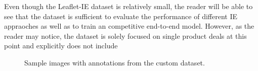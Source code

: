 \documentclass[11pt]{article}
\begin{document}
Even though the Leaflet-IE dataset is relatively small, the reader will be able to see that the dataset is sufficient to evaluate the performance of different IE appraoches as well as to train an competitive end-to-end model. However, as the reader may notice, the dataset is solely focused on single product deals at this point and explicitly does not include 

\begin{figure}[ht]
\centering
{}
\caption{Sample images with annotations from the custom dataset.}
\label{fig:ie_dataset_samples}
\end{figure}





        
\end{document}
